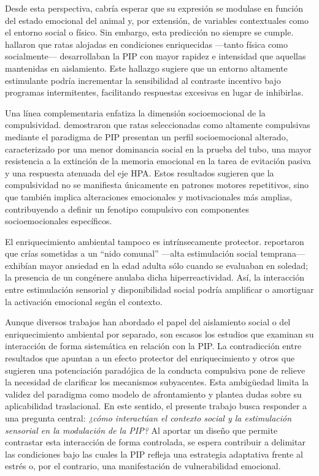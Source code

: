 \documentclass[12pt,a4paper]{article}
\begin{document}
\begin{multicols}{2}
Desde esta perspectiva, cabría esperar que su expresión se modulase en función del estado emocional del animal y, por extensión, de variables contextuales como el entorno social o físico. Sin embargo, esta predicción no siempre se cumple. \citet{FuentesVerdugo2023} hallaron que ratas alojadas en condiciones enriquecidas —tanto física como socialmente— desarrollaban la PIP con mayor rapidez e intensidad que aquellas mantenidas en aislamiento. Este hallazgo sugiere que un entorno altamente estimulante podría incrementar la sensibilidad al contraste incentivo bajo programas intermitentes, facilitando respuestas excesivas en lugar de inhibirlas.

Una línea complementaria enfatiza la dimensión socioemocional de la compulsividad. \citet{MartinGonzalez2022} demostraron que ratas seleccionadas como altamente compulsivas mediante el paradigma de PIP presentan un perfil socioemocional alterado, caracterizado por una menor dominancia social en la prueba del tubo, una mayor resistencia a la extinción de la memoria emocional en la tarea de evitación pasiva y una respuesta atenuada del eje HPA. Estos resultados sugieren que la compulsividad no se manifiesta únicamente en patrones motores repetitivos, sino que también implica alteraciones emocionales y motivacionales más amplias, contribuyendo a definir un fenotipo compulsivo con componentes socioemocionales específicos.

El enriquecimiento ambiental tampoco es intrínsecamente protector. \citet{Branchi2006} reportaron que crías sometidas a un “nido comunal” —alta estimulación social temprana— exhibían mayor ansiedad en la edad adulta sólo cuando se evaluaban en soledad; la presencia de un congénere anulaba dicha hiperreactividad. Así, la interacción entre estimulación sensorial y disponibilidad social podría amplificar o amortiguar la activación emocional según el contexto.

Aunque diversos trabajos han abordado el papel del aislamiento social o del enriquecimiento ambiental por separado, son escasos los estudios que examinan su interacción de forma sistemática en relación con la PIP. La contradicción entre resultados que apuntan a un efecto protector del enriquecimiento y otros que sugieren una potenciación paradójica de la conducta compulsiva pone de relieve la necesidad de clarificar los mecanismos subyacentes. Esta ambigüedad limita la validez del paradigma como modelo de afrontamiento y plantea dudas sobre su aplicabilidad traslacional. En este sentido, el presente trabajo busca responder a una pregunta central: \textit{¿cómo interactúan el contexto social y la estimulación sensorial en la modulación de la PIP?} Al aportar un diseño que permite contrastar esta interacción de forma controlada, se espera contribuir a delimitar las condiciones bajo las cuales la PIP refleja una estrategia adaptativa frente al estrés o, por el contrario, una manifestación de vulnerabilidad emocional.


\end{multicols}
\end{document}
